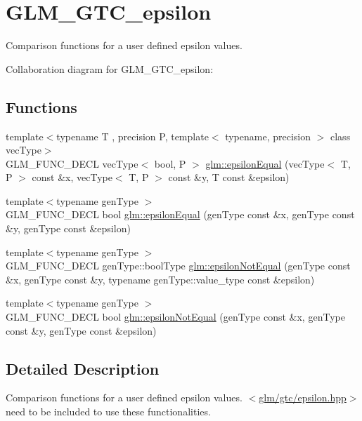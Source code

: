 \hypertarget{group__gtc__epsilon}{\section{G\-L\-M\-\_\-\-G\-T\-C\-\_\-epsilon}
\label{group__gtc__epsilon}
}


Comparison functions for a user defined epsilon values.  


Collaboration diagram for G\-L\-M\-\_\-\-G\-T\-C\-\_\-epsilon\-:
\subsection*{Functions}
\begin{DoxyCompactItemize}
\item 
{\footnotesize template$<$typename T , precision P, template$<$ typename, precision $>$ class vec\-Type$>$ }\\G\-L\-M\-\_\-\-F\-U\-N\-C\-\_\-\-D\-E\-C\-L vec\-Type$<$ bool, P $>$ \hyperlink{group__gtc__epsilon_gaca9443f217dc36587624247245522331}{glm\-::epsilon\-Equal} (vec\-Type$<$ T, P $>$ const \&x, vec\-Type$<$ T, P $>$ const \&y, T const \&epsilon)
\item 
{\footnotesize template$<$typename gen\-Type $>$ }\\G\-L\-M\-\_\-\-F\-U\-N\-C\-\_\-\-D\-E\-C\-L bool \hyperlink{group__gtc__epsilon_gaa7f227999ca09e7ca994e8b35aba47bb}{glm\-::epsilon\-Equal} (gen\-Type const \&x, gen\-Type const \&y, gen\-Type const \&epsilon)
\item 
{\footnotesize template$<$typename gen\-Type $>$ }\\G\-L\-M\-\_\-\-F\-U\-N\-C\-\_\-\-D\-E\-C\-L gen\-Type\-::bool\-Type \hyperlink{group__gtc__epsilon_ga14e2888a304654ade8a3996024e2739c}{glm\-::epsilon\-Not\-Equal} (gen\-Type const \&x, gen\-Type const \&y, typename gen\-Type\-::value\-\_\-type const \&epsilon)
\item 
{\footnotesize template$<$typename gen\-Type $>$ }\\G\-L\-M\-\_\-\-F\-U\-N\-C\-\_\-\-D\-E\-C\-L bool \hyperlink{group__gtc__epsilon_ga50a92103fb0cbd796908e1bf20c79aaf}{glm\-::epsilon\-Not\-Equal} (gen\-Type const \&x, gen\-Type const \&y, gen\-Type const \&epsilon)
\end{DoxyCompactItemize}


\subsection{Detailed Description}
Comparison functions for a user defined epsilon values. $<$\hyperlink{epsilon_8hpp}{glm/gtc/epsilon.\-hpp}$>$ need to be included to use these functionalities. 

